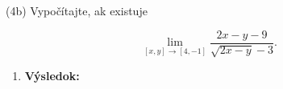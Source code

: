 \pr (4b) Vypočítajte, ak existuje

$$
\lim\limits_{
[x,y]\rightarrow [4,-1]}
\frac{2x-y-9}{\sqrt{2x-y}-3}.
$$

\begin{enumerate}

\item[]\textbf{Výsledok:}\gr

\end{enumerate}
